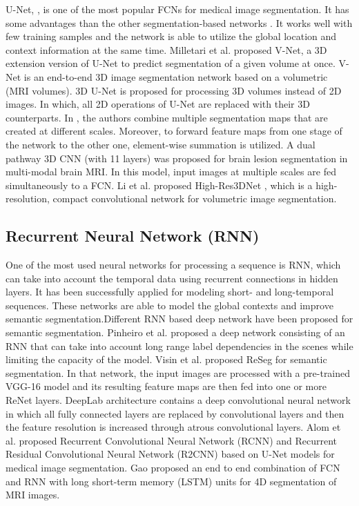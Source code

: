 \documentclass[journal]{IEEEtran}
\begin{document}
U-Net, \cite{ronneberger2015}, is one of the most popular FCNs for medical image segmentation. It has some advantages than the other segmentation-based networks \cite{alom2018}. It works well with few training samples and the network is able to utilize the global location and context information at the same time.
Milletari et al. \cite{milletari2016} proposed V-Net, a 3D extension version of U-Net to predict segmentation of a given volume at once. V-Net is an end-to-end 3D image segmentation network based on a volumetric (MRI volumes). 3D U-Net \cite{cciccek20163d} is proposed for processing 3D volumes instead of 2D images. In which, all 2D operations of U-Net are replaced with their 3D counterparts. 
In \cite{kayalibay2017}, the authors combine multiple segmentation maps that are created at different scales. Moreover, to forward feature maps from one stage of the network to the other one, element-wise summation is utilized.
A dual pathway 3D CNN (with 11 layers) \cite{kamnitsas2017} was proposed for brain lesion segmentation in multi-modal brain MRI. In this model, input images at multiple scales are fed simultaneously to a FCN. 
Li et al. proposed High-Res3DNet \cite{li2017compactness}, which is a high-resolution, compact convolutional network for volumetric image segmentation. 








\subsection{Recurrent Neural Network (RNN)}
One of the most used neural networks for processing a sequence is RNN, which can take into account the temporal data using recurrent connections in hidden layers. It has been successfully applied for modeling short- and long-temporal sequences. These networks are able to model the global contexts and improve semantic segmentation.Different RNN based deep network have been proposed for semantic segmentation. 
Pinheiro et al. \cite{pinheiro2014} proposed a deep network consisting of an RNN that can take into account long range label dependencies in the scenes while limiting the capacity of the model. Visin et al. \cite{visin2016reseg} proposed ReSeg for semantic segmentation. In that network, the input images are processed with a pre-trained VGG-16 model and its resulting feature maps are then fed into one or more ReNet layers. DeepLab architecture \cite{chen2017deeplab} contains a deep convolutional neural network in which all fully connected layers are replaced by convolutional layers and then the feature resolution is increased through atrous convolutional layers.
Alom et al. \cite{alom2018} proposed Recurrent Convolutional Neural Network (RCNN) and Recurrent Residual Convolutional Neural Network (R2CNN) based on U-Net models for medical image segmentation. Gao \cite{gao2018fully} proposed an end to end combination of FCN and RNN with long short-term memory (LSTM) units for 4D segmentation of MRI images.
\end{document}
